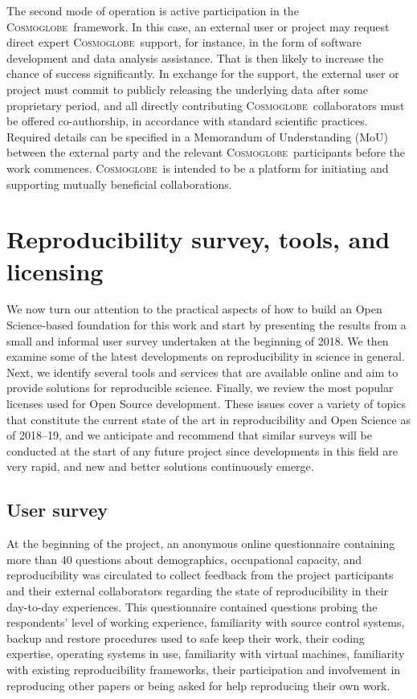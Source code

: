 \documentclass[twocolumn]{aa}
\newcommand{\cosmoglobe}{\textsc{Cosmoglobe}}
\begin{document}
The second mode of operation is active participation in the \cosmoglobe\ framework. In this case, an external user or project may request direct expert \cosmoglobe\ support, for instance, in the form of software development and data analysis assistance. That is then likely to increase the chance of success significantly. In exchange for the support, the external user or project must commit to publicly releasing the underlying data after some proprietary period, and all directly contributing \cosmoglobe\ collaborators must be offered co-authorship, in accordance with standard scientific practices. Required details can be specified in a Memorandum of Understanding (MoU) between the external party and the relevant \cosmoglobe\ participants before the work commences. \cosmoglobe\ is intended to be a platform for initiating and supporting mutually beneficial collaborations.

\section{Reproducibility survey, tools, and licensing}
\label{sec:reproducibility}

We now turn our attention to the practical aspects of how to build an Open Science-based foundation for this work and start by presenting the results from a small and informal user survey undertaken at the beginning of 2018. We then examine some of the latest developments on reproducibility in science in general. Next, we identify several tools and services that are available online and aim to provide solutions for reproducible science. Finally, we review the most popular licenses used for Open Source development. These issues cover a variety of topics that constitute the current state of the art in reproducibility and Open Science as of 2018--19, and we anticipate and recommend that similar surveys will be conducted at the start of any future project since developments in this field are very rapid, and new and better solutions continuously emerge.

\subsection{User survey}

At the beginning of the project, an anonymous online questionnaire containing more than 40 questions about demographics, occupational capacity, and reproducibility was circulated to collect feedback from the project participants and their external collaborators regarding the state of reproducibility in their day-to-day experiences. This questionnaire contained questions probing the respondents' level of working experience, familiarity with source control systems, backup and restore procedures used to safe keep their work, their coding expertise, operating systems in use, familiarity with virtual machines, familiarity with existing reproducibility frameworks, their participation and involvement in reproducing other papers or being asked for help reproducing their own work.
\end{document}
